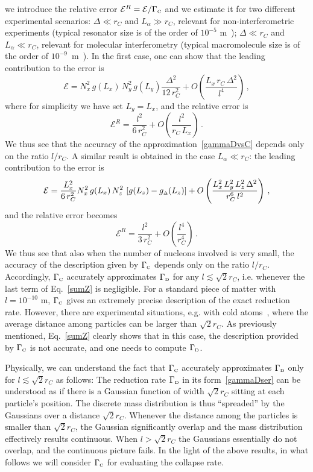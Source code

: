 \documentclass[11pt,onecolumn,amssymb,nofootinbib]{revtex4}
\newcommand\beq{\begin{equation}}
\newcommand\eeq{\end{equation}}
\begin{document}
we introduce the relative error $\mathcal{E}^R=\mathcal{E}/\Gamma_\text{\tiny{C}}$ and we estimate it for two different experimental scenarios: $\Delta\ll r_C$ and $L_\alpha\gg r_C$, relevant for non-interferometric experiments (typical resonator size is of the order of $10^{-5}$ m~\cite{Vinetal17}); $\Delta\ll r_C$ and $L_\alpha\ll r_C$, relevant for molecular interferometry (typical macromolecule size is of the order of $10^{-9}$~m~\cite{molecules}).
In the first case, one can show that the leading contribution to the error is
\beq
\mathcal{E}= N_x^2\,g(L_x)\,N_y^2\,g(L_y)\frac{\Delta^2}{12\,r_C^2}+O\left(\frac{L_x\,r_C\,\Delta^2}{l^4}\right)\,,
\eeq
where for simplicity we have set $L_y=L_x$, and the relative error is
\beq
\mathcal{E}^R=\frac{l^2}{6\,r_C^2}+O\left(\frac{l^2}{r_C\,L_x}\right)\,.%
\eeq
We thus see that the accuracy of the approximation~\eqref{gammaDvsC}  depends only on the ratio $l/r_C$. 
A similar result is obtained in the case $L_\alpha\ll r_C$: the leading contribution to the error is
\beq
\mathcal{E}=\frac{L_x^2}{6\,r_C^2}N_x^2\,g(L_x)\,N_z^2\,\left[g(L_z)-g_{\text{\tiny{$\Delta$}}}(L_z)\right]+O\left(\frac{L_x^2\,L_y^2\,L_z^2\,\Delta^2}{r_C^6\,l^2}\right)\,,
\eeq
and the relative error becomes
\beq
\mathcal{E}^R=\frac{l^2}{3\, r_C^2}+O\left(\frac{l^4}{r_C^4}\right)\,.%
\eeq
We thus see that also when the number of nucleons involved is very small, the accuracy of the description given by $\Gamma_\text{\tiny{C}}$ depends only on the ratio $l/r_C$. Accordingly, $\Gamma_\text{\tiny{C}}$ accurately approximates $\Gamma_\text{\tiny{D}}$ for any $l\lesssim\sqrt{2} r_C$, i.e. whenever the last term of Eq.~\eqref{sumZ} is negligible. For a standard piece of matter with $l=10^{-10}$ m,  $\Gamma_\text{\tiny{C}}$ gives an extremely precise description of the exact reduction rate.
However, there are experimental situations, e.g. with cold atoms~\cite{coldat}, where the average distance among particles can be larger than $\sqrt{2} r_C$.
As previously mentioned, Eq.~\eqref{sumZ} clearly shows that in this case, the description provided by $\Gamma_\text{\tiny{C}}$ is not accurate, and one needs to compute $\Gamma_\text{\tiny{D}}$.

Physically, we can understand the fact that $\Gamma_\text{\tiny{C}}$ accurately approximates $\Gamma_\text{\tiny{D}}$ only for $l\lesssim\sqrt{2} r_C$ as follows: The reduction rate $\Gamma_\text{\tiny{D}}$ in its form~\eqref{gammaDser} can be understood as if there is a Gaussian function of width $\sqrt{2}r_C$ sitting at each particle's position. The discrete mass distribution is thus ``spreaded'' by the Gaussians over a distance $\sqrt{2}r_C$. Whenever the distance among the particles is smaller than $\sqrt{2}r_C$, the Gaussian significantly overlap and the mass distribution effectively results continuous. When $l>\sqrt{2}r_C$ the Gaussians essentially do not overlap, and the continuous picture fails. In the light of the above results, in what follows we will consider $\Gamma_\text{\tiny{C}}$ for evaluating the collapse rate.
\end{document}
